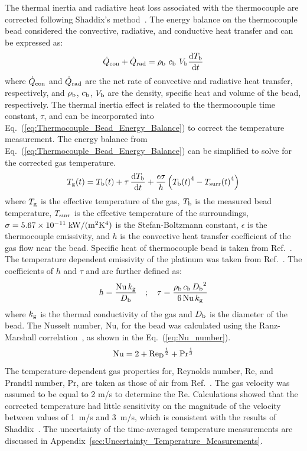 \documentclass[12pt]{article}
\begin{document}
The thermal inertia and radiative heat loss associated with the thermocouple are corrected following Shaddix's method~\cite{Shaddix1999}. The energy balance on the thermocouple bead considered the convective, radiative, and conductive heat transfer and can be expressed as:
\begin{equation}\label{eq:Thermocouple_Bead_Energy_Balance}
{\dot{Q}_{\rm con}+\dot{Q}_{\rm rad}}= \rho_{\rm b}~c_{\rm b}~V_{\rm b}\frac{{\rm d}T_{\rm b}}{{\rm d}t}
\end{equation}
where $\dot{Q}_{\rm con}$ and $\dot{Q}_{\rm rad}$ are the net rate of convective and radiative heat transfer, respectively, and $\rho_{\rm b}$, $c_{\rm b}$, $V_{\rm b}$ are the density, specific heat and volume of the bead, respectively. The thermal inertia effect is related to the thermocouple time constant, $\tau$, and can be incorporated into Eq.~(\ref{eq:Thermocouple_Bead_Energy_Balance}) to correct the temperature measurement. The energy balance from Eq.~(\ref{eq:Thermocouple_Bead_Energy_Balance}) can be simplified to solve for the corrected gas temperature.
\begin{equation}\label{eq:Thermocouple_Bead_Correction}
{T_{\rm g}(t)}= T_{\rm b}(t) + \tau \, \frac{{\rm d}T_{\rm b}}{{\rm d}t} + \frac{\epsilon\sigma}{h}\left({T_{\rm b}(t)}^4-{T_{\rm surr}(t)}^4\right)
\end{equation}
where $T_{\rm g}$ is the effective temperature of the gas, $T_{\rm b}$ is the measured bead temperature, $T_{\rm surr}$ is the effective temperature of the surroundings, $\sigma=5.67 \times 10^{-11} \; {\rm kW}/({\rm m}^2{\rm K}^4)$ is the Stefan-Boltzmann constant, $\epsilon$ is the thermocouple emissivity, and $h$ is the convective heat transfer coefficient of the gas flow near the bead. Specific heat of thermocouple bead is taken from Ref.~\cite{Jaeger1939}. The temperature dependent emissivity of the platinum was taken from Ref.~\cite{Incropera2007}. The coefficients of $h$ and $\tau$ and are further defined as:
\begin{equation}\label{eq:h_eqn}
h=\frac{{\rm Nu} \, k_{\rm g}}{D_{\rm b}}  \quad ; \quad \tau= \frac{\rho_{\rm b} \, c_{\rm b} \, {D_{\rm b}}^2}{6 \, {\rm Nu} \, k_{\rm g}}
\end{equation}
where $k_{\rm g}$ is the thermal conductivity of the gas and $D_{\rm b}$ is the diameter of the bead. The Nusselt number, Nu, for the bead was calculated using the Ranz-Marshall correlation~\cite{Shaddix1999}, as shown in the Eq.~(\ref{eq:Nu_number}).
\begin{equation}\label{eq:Nu_number}
{\rm Nu} = 2+{\textrm{Re}_{\rm D}}^{\frac{1}{2}}+\textrm{Pr}^{\frac{1}{3}}
\end{equation}
The temperature-dependent gas properties for, Reynolds number, Re, and Prandtl number, Pr, are taken as those of air from Ref.~\cite{Dippr}. The gas velocity was assumed to be equal to 2 m/s to determine the Re. Calculations showed that the corrected temperature had little sensitivity on the magnitude of the velocity between values of \SI{1}{ m/s} and \SI{3}{m/s}, which is consistent with the results of Shaddix~\cite{Shaddix1999}. The uncertainty of the time-averaged temperature measurements are discussed in Appendix~\ref{sec:Uncertainty_Temperature_Measurements}.
\end{document}
